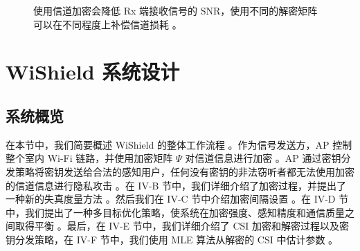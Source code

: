 \documentclass[journal]{IEEEtran}
\begin{document}
\begin{figure}[htbp]
\centering
\caption{使用信道加密会降低 Rx 端接收信号的 SNR，使用不同的解密矩阵可以在不同程度上补偿信道损耗 。}
\label{fig:snr}
\end{figure}

\section{WiShield 系统设计}
\subsection{系统概览}
在本节中，我们简要概述 WiShield 的整体工作流程 。作为信号发送方，AP 控制整个室内 Wi-Fi 链路，并使用加密矩阵 $\Psi$ 对信道信息进行加密 。AP 通过密钥分发策略将密钥发送给合法的感知用户，任何没有密钥的非法窃听者都无法使用加密的信道信息进行隐私攻击 。在 IV-B 节中，我们详细介绍了加密过程，并提出了一种新的失真度量方法 。然后我们在 IV-C 节中介绍加密间隔设置 。在 IV-D 节中，我们提出了一种多目标优化策略，使系统在加密强度、感知精度和通信质量之间取得平衡 。最后，在 IV-E 节中，我们详细介绍了 CSI 加密和解密过程以及密钥分发策略，在 IV-F 节中，我们使用 MLE 算法从解密的 CSI 中估计参数 。
\end{document}
